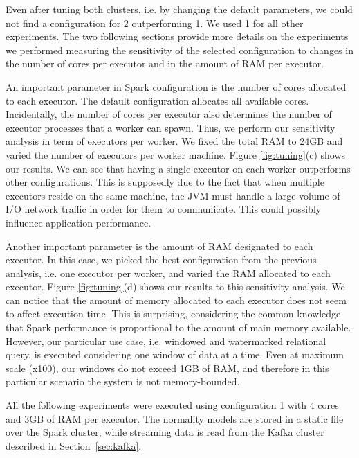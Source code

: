 {Even after tuning both clusters, i.e. by changing the default parameters, we could not find a configuration for \sparkdi{}2 outperforming \sparkdi{}1. We used \sparkdi{}1 for all other experiments. The two following sections provide more details on the experiments we performed measuring the sensitivity of the selected configuration to changes in the number of cores per executor and in the amount of RAM per executor.

An important parameter in Spark configuration is the number of cores allocated to each executor. The default configuration allocates all available cores. Incidentally, the number of cores per executor also determines the number of executor processes that a worker can spawn. Thus, we perform our sensitivity analysis in term of executors per worker. We fixed the total RAM to 24GB and varied the number of executors per worker machine. Figure \ref{fig:tuning}(c) shows our results. We can see that having a single executor on each worker outperforms other configurations. This is supposedly due to the fact that when multiple executors reside on the same machine, the JVM must handle a large volume of I/O network traffic in order for them to communicate. This could possibly influence application performance.

Another important parameter is the amount of RAM designated to each executor. In this case, we picked the best configuration from the previous analysis, i.e. one executor per worker, and varied the RAM allocated to each executor. Figure \ref{fig:tuning}(d) shows our results to this sensitivity analysis. We can notice that the amount of memory allocated to each executor does not seem to affect execution time. This is surprising, considering the common knowledge that Spark performance is proportional to the amount of main memory available. However, our particular use case, i.e. windowed and watermarked relational query, is executed considering one window of data at a time. Even at maximum scale (x100), our windows do not exceed 1GB of RAM, and therefore in this particular scenario the system is not memory-bounded.

All the following experiments were executed using configuration \sparkdi{}1 with 4 cores and 3GB of RAM per executor. The normality models are stored in a static file over the Spark cluster, while streaming data is read from the Kafka cluster described in Section~\ref{sec:kafka}.

}
